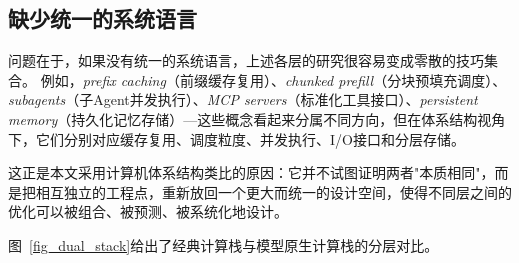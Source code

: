 \subsection{缺少统一的系统语言}

问题在于，如果没有统一的系统语言，上述各层的研究很容易变成零散的技巧集合。
例如，\emph{prefix caching}（前缀缓存复用）、\emph{chunked prefill}（分块预填充调度）、\emph{subagents}（子Agent并发执行）、\emph{MCP servers}（标准化工具接口）、\emph{persistent memory}（持久化记忆存储）---这些概念看起来分属不同方向，但在体系结构视角下，它们分别对应缓存复用、调度粒度、并发执行、I/O接口和分层存储。

这正是本文采用计算机体系结构类比的原因：它并不试图证明两者"本质相同"，而是把相互独立的工程点，重新放回一个更大而统一的设计空间，使得不同层之间的优化可以被组合、被预测、被系统化地设计。

图~\ref{fig_dual_stack}给出了经典计算栈与模型原生计算栈的分层对比。


